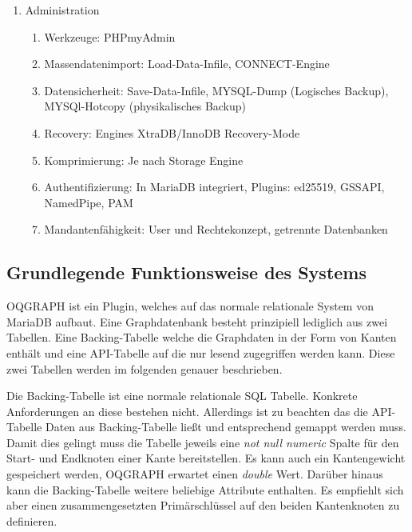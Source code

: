 \begin{enumerate}
\begin{enumerate}
	\end{enumerate}
	\item Administration
	\begin{enumerate}
		\item Werkzeuge: PHPmyAdmin
		\item Massendatenimport: Load-Data-Infile, CONNECT-Engine
		\item Datensicherheit: Save-Data-Infile, MYSQL-Dump (Logisches Backup), MYSQl-Hotcopy (physikalisches Backup)
		\item Recovery: Engines XtraDB/InnoDB Recovery-Mode
		\item Komprimierung: Je nach Storage Engine
		\item Authentifizierung: In MariaDB integriert, Plugins: ed25519, GSSAPI, NamedPipe, PAM
		\item Mandantenfähigkeit: User und Rechtekonzept, getrennte Datenbanken
	\end{enumerate}
\end{enumerate}

\subsection{Grundlegende Funktionsweise des Systems}
OQGRAPH ist ein Plugin, welches auf das normale relationale System von MariaDB aufbaut. Eine Graphdatenbank besteht prinzipiell lediglich aus zwei Tabellen. Eine Backing-Tabelle welche die Graphdaten in der Form von Kanten enthält und eine API-Tabelle auf die nur lesend zugegriffen werden kann. Diese zwei Tabellen werden im folgenden genauer beschrieben.

Die Backing-Tabelle ist eine normale relationale SQL Tabelle. Konkrete Anforderungen an diese bestehen nicht. Allerdings ist zu beachten das die API-Tabelle Daten aus Backing-Tabelle ließt und entsprechend gemappt werden muss. Damit dies gelingt muss die Tabelle jeweils eine \emph{not null numeric} Spalte für den Start- und Endknoten einer Kante bereitstellen. Es kann auch ein Kantengewicht gespeichert werden, OQGRAPH erwartet einen \emph{double} Wert. Darüber hinaus kann die Backing-Tabelle weitere beliebige Attribute enthalten. Es empfiehlt sich aber einen zusammengesetzten Primärschlüssel auf den beiden Kantenknoten zu definieren. %

